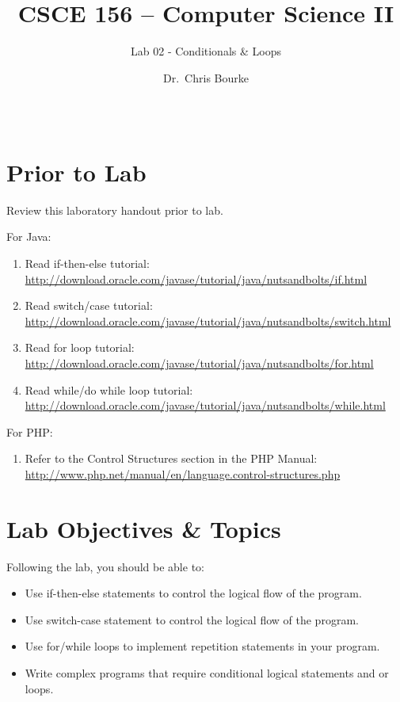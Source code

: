 \documentclass[12pt]{scrartcl}
\title{CSCE 156 -- Computer Science II}
\subtitle{Lab 02 - Conditionals \& Loops}
\author{Dr.\ Chris Bourke}
\date{~}
\begin{document}
\maketitle

\section*{Prior to Lab}

Review this laboratory handout prior to lab.

For Java:
\begin{enumerate}
  \item Read if-then-else tutorial: \\
  	\url{http://download.oracle.com/javase/tutorial/java/nutsandbolts/if.html}
  \item Read switch/case tutorial:\\
  	\url{http://download.oracle.com/javase/tutorial/java/nutsandbolts/switch.html}
  \item Read for loop tutorial:\\
  	\url{http://download.oracle.com/javase/tutorial/java/nutsandbolts/for.html}
  \item Read while/do while loop tutorial:\\
  	\url{http://download.oracle.com/javase/tutorial/java/nutsandbolts/while.html}
\end{enumerate}

For PHP:
\begin{enumerate}
  \item Refer to the Control Structures section in the PHP Manual: \\
    \url{http://www.php.net/manual/en/language.control-structures.php}
\end{enumerate}

\section*{Lab Objectives \& Topics}
Following the lab, you should be able to:
\begin{itemize}
  \item Use if-then-else statements to control the logical flow of the program.
  \item Use switch-case statement to control the logical flow of the program.
  \item Use for/while loops to implement repetition statements in your program.
  \item Write complex programs that require conditional logical statements and or loops.
\end{itemize}
\end{document}
